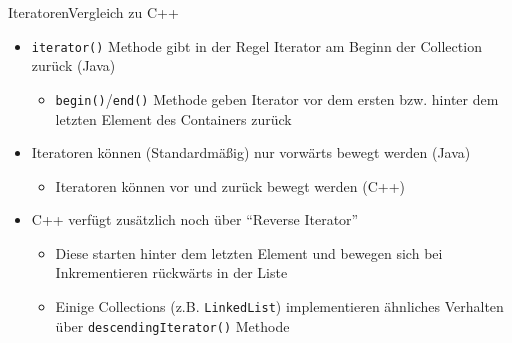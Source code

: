 \begin{frame}{Iteratoren}{Vergleich zu C++}
\begin{itemize}[<+->]
    \item \texttt{iterator()} Methode gibt in der Regel Iterator am Beginn der Collection zurück (Java)
    \begin{itemize}
        \item \texttt{begin()}/\texttt{end()} Methode geben Iterator vor dem ersten bzw. hinter dem letzten Element des Containers zurück
    \end{itemize}
    \item Iteratoren können (Standardmäßig) nur vorwärts bewegt werden (Java)
    \begin{itemize}
        \item Iteratoren können vor und zurück bewegt werden (C++)
    \end{itemize}
    \item C++ verfügt zusätzlich noch über "`Reverse Iterator"'
    \begin{itemize}
        \item Diese starten hinter dem letzten Element und bewegen sich bei Inkrementieren rückwärts in der Liste
        \item Einige Collections (z.B. \texttt{LinkedList}) implementieren ähnliches Verhalten über \texttt{descendingIterator()} Methode
    \end{itemize}
\end{itemize}
\end{frame}